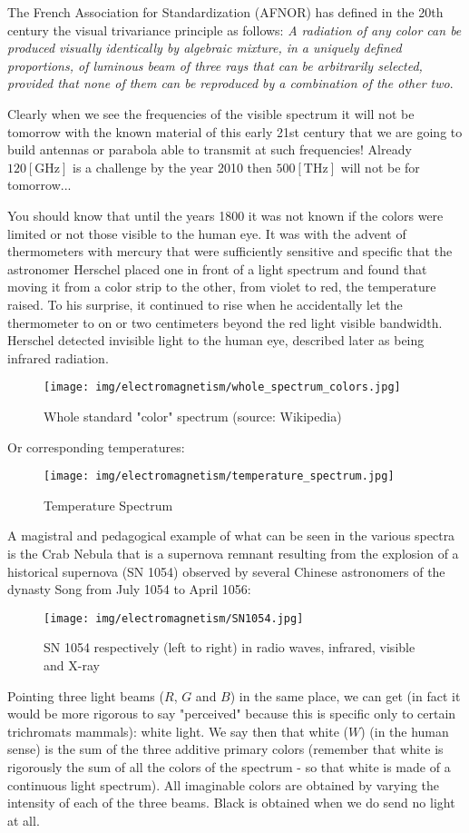 	The French Association for Standardization (AFNOR) has defined in the 20th century the visual trivariance principle as follows:\textit{ A radiation of any color can be produced visually identically by algebraic mixture, in a uniquely defined proportions, of luminous beam of three rays that can be arbitrarily selected, provided that none of them can be reproduced by a combination of the other two}.
	
	Clearly when we see the frequencies of the visible spectrum it will not be tomorrow with the known material of this early 21st century that we are going to build antennas or parabola able to transmit at such frequencies! Already $120 [\text{GHz}]$ is a challenge by the year 2010 then $500 [\text{THz}]$ will not be for tomorrow...
	
	You should know that until the years 1800 it was not known if the colors were limited or not those visible to the human eye. It was with the advent of thermometers with mercury that were sufficiently sensitive and specific that the astronomer Herschel placed one in front of a light spectrum and found that moving it from a color strip to the other, from violet to red, the temperature raised. To his surprise, it continued to rise when he accidentally let the thermometer to on or two centimeters beyond the red light visible bandwidth. Herschel detected invisible light to the human eye, described later as being infrared radiation.
	\begin{figure}[H]
		\centering
		\texttt{[image: img/electromagnetism/whole\_spectrum\_colors.jpg]}
		\caption{Whole standard "color" spectrum (source: Wikipedia)}
	\end{figure}
	Or corresponding temperatures:
	\begin{figure}[H]
		\centering
		\texttt{[image: img/electromagnetism/temperature\_spectrum.jpg]}
		\caption{Temperature Spectrum}
	\end{figure}
	A magistral and pedagogical example of what can be seen in the various spectra is the Crab Nebula that is a supernova remnant resulting from the explosion of a historical supernova (SN 1054) observed by several Chinese astronomers of the dynasty Song from July 1054 to April 1056:
	\begin{figure}[H]
		\centering
		\texttt{[image: img/electromagnetism/SN1054.jpg]}
		\caption{SN 1054 respectively (left to right) in radio waves, infrared, visible and X-ray}
	\end{figure}
	Pointing three light beams ($R$, $G$ and $B$) in the same place, we can get (in fact it would be more rigorous to say "perceived" because this is specific only to certain trichromats mammals): white light. We say then that white ($W$) (in the human sense) is the sum of the three additive primary colors (remember that white is rigorously the sum of all the colors of the spectrum - so that white is made of a continuous light spectrum). All imaginable colors are obtained by varying the intensity of each of the three beams. Black is obtained when we do send no light at all.
	
